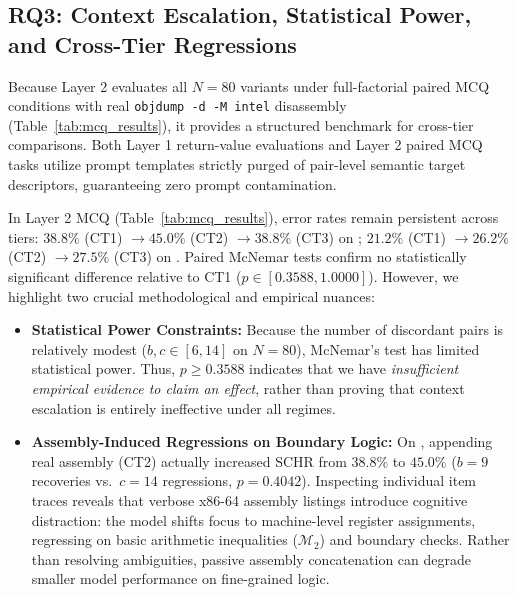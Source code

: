 \documentclass[runningheads]{llncs}
\begin{document}
\subsection{RQ3: Context Escalation, Statistical Power, and Cross-Tier Regressions}
\label{sec:rq3}
Because Layer 2 evaluates all $N=80$ variants under full-factorial paired MCQ conditions with real \texttt{objdump -d -M intel} disassembly (Table~\ref{tab:mcq_results}), it provides a structured benchmark for cross-tier comparisons. Both Layer 1 return-value evaluations and Layer 2 paired MCQ tasks utilize prompt templates strictly purged of pair-level semantic target descriptors, guaranteeing zero prompt contamination.

In Layer 2 MCQ (Table~\ref{tab:mcq_results}), error rates remain persistent across tiers: $38.8\%$ (CT1) $\rightarrow 45.0\%$ (CT2) $\rightarrow 38.8\%$ (CT3) on ; $21.2\%$ (CT1) $\rightarrow 26.2\%$ (CT2) $\rightarrow 27.5\%$ (CT3) on . Paired McNemar tests confirm no statistically significant difference relative to CT1 ($p \in [0.3588, 1.0000]$). However, we highlight two crucial methodological and empirical nuances:
\begin{itemize}
    \item \textbf{Statistical Power Constraints:} Because the number of discordant pairs is relatively modest ($b, c \in [6, 14]$ on $N=80$), McNemar's test has limited statistical power. Thus, $p \ge 0.3588$ indicates that we have \textit{insufficient empirical evidence to claim an effect}, rather than proving that context escalation is entirely ineffective under all regimes.
    \item \textbf{Assembly-Induced Regressions on Boundary Logic:} On , appending real assembly (CT2) actually increased SCHR from $38.8\%$ to $45.0\%$ ($b=9$ recoveries vs.\ $c=14$ regressions, $p=0.4042$). Inspecting individual item traces reveals that verbose x86-64 assembly listings introduce cognitive distraction: the model shifts focus to machine-level register assignments, regressing on basic arithmetic inequalities ($\mathcal{M}_2$) and boundary checks. Rather than resolving ambiguities, passive assembly concatenation can degrade smaller model performance on fine-grained logic.
\end{itemize}
\end{document}
